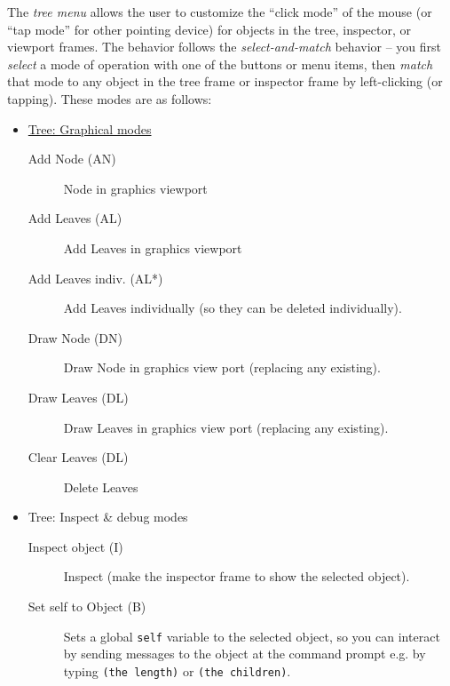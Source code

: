 \documentclass [11pt]{book}
\begin{document}
The \emph{tree menu} allows the user to customize the ``click mode'' of the
mouse (or ``tap mode'' for other pointing device) for objects in the
tree, inspector, or viewport frames. The behavior follows the \emph{select-and-match} behavior -- you first \emph{select} a mode of operation with one of the buttons or menu items, 
then \emph{match} that mode to any object in the tree frame or inspector frame by
left-clicking (or tapping). These modes are as follows:



\begin{itemize}

\item 
\underline{Tree: Graphical modes}

\begin{description}

\item [Add Node (AN)]
Node in graphics viewport

\item [Add Leaves (AL)]
Add Leaves in graphics viewport

\item [Add Leaves indiv. (AL*)]
Add Leaves individually (so they can be deleted individually).

\item [Draw Node (DN)]
Draw Node in graphics view port (replacing any existing).

\item [Draw Leaves (DL)]
Draw Leaves in graphics view port (replacing any existing).

\item [Clear Leaves (DL)]
Delete Leaves

\end{description}



\item Tree: Inspect \& debug modes

\begin{description}

\item [Inspect object (I)]
Inspect (make the inspector frame to show the selected object).

\item [Set self to Object (B)]
Sets a global \texttt{self} variable to the selected object, so you can interact by sending messages to the object at the command prompt e.g. by typing \texttt{(the length)} or \texttt{(the children)}.


\end{description}
\end{itemize}
\end{document}
